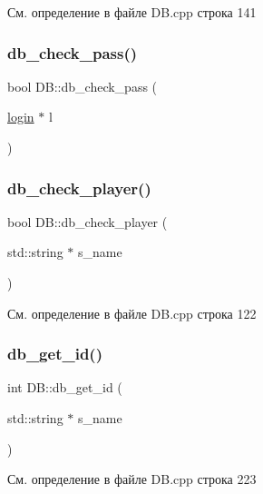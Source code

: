 См. определение в файле D\+B.\+cpp строка 141

\mbox{\label{class_d_b_a0608c5cb7f815d143a54bda2e318de84}} 
\subsubsection{\texorpdfstring{db\_check\_pass()}{db\_check\_pass()}}
{\footnotesize\ttfamily bool D\+B\+::db\+\_\+check\+\_\+pass (\begin{DoxyParamCaption}\item[{\mbox{\hyperlink{structlogin}{login}} $\ast$}]{l }\end{DoxyParamCaption})}

\mbox{\label{class_d_b_aea6044c3fffc4c31714c732bb3789f71}} 
\subsubsection{\texorpdfstring{db\_check\_player()}{db\_check\_player()}}
{\footnotesize\ttfamily bool D\+B\+::db\+\_\+check\+\_\+player (\begin{DoxyParamCaption}\item[{std\+::string $\ast$}]{s\+\_\+name }\end{DoxyParamCaption})}



См. определение в файле D\+B.\+cpp строка 122

\mbox{\label{class_d_b_aa8cdb5ec4f2f269d13cff52b9e47c4cb}} 
\subsubsection{\texorpdfstring{db\_get\_id()}{db\_get\_id()}}
{\footnotesize\ttfamily int D\+B\+::db\+\_\+get\+\_\+id (\begin{DoxyParamCaption}\item[{std\+::string $\ast$}]{s\+\_\+name }\end{DoxyParamCaption})}



См. определение в файле D\+B.\+cpp строка 223

